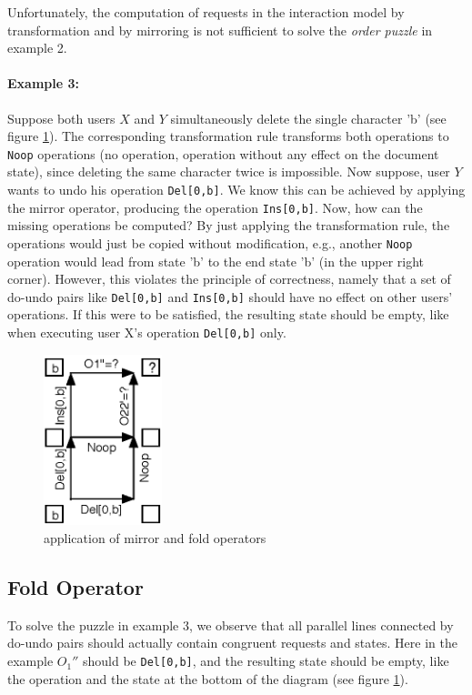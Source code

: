 Unfortunately, the computation of requests in the interaction model by transformation and by mirroring is not sufficient to solve the \emph{order puzzle} in example 2.

\paragraph{Example 3:} Suppose both users $X$ and $Y$ simultaneously delete the single character 'b' (see figure \ref{fig:concepts.basicfold}). The corresponding transformation rule transforms both operations to \texttt{Noop} operations (no operation, operation without any effect on the document state), since deleting the same character twice is impossible. Now suppose, user $Y$ wants to undo his operation \texttt{Del[0,b]}. We know this can be achieved by applying the mirror operator, producing the operation \texttt{Ins[0,b]}. Now, how can the missing operations be computed? By just applying the transformation rule, the operations would just be copied without modification, e.g., another \texttt{Noop} operation would lead from state 'b' to the end state 'b' (in the upper right corner). However, this violates the principle of correctness, namely that a set of do-undo pairs like \texttt{Del[0,b]} and \texttt{Ins[0,b]} should have no effect on other users' operations. If this were to be satisfied, the resulting state should be empty, like when executing user X's operation \texttt{Del[0,b]} only. 

\begin{figure}[htb]
 \centering
 \includegraphics[width=3.45cm,height=4.97cm]{../../images/concepts_basicfold.eps}
 \caption{application of mirror and fold operators}
 \label{fig:concepts.basicfold}
\end{figure}


\subsection{Fold Operator}
To solve the puzzle in example 3, we observe that all parallel lines connected by do-undo pairs should actually contain congruent requests and states. Here in the example $O_{1}''$ should be \texttt{Del[0,b]}, and the resulting state should be empty, like the operation and the state at the bottom of the diagram (see figure \ref{fig:concepts.basicfold}).

